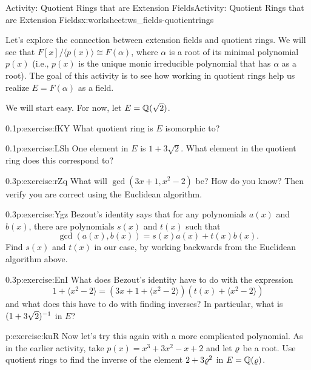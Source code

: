 \documentclass[11pt]{book}
\begin{document}
%
%
\typeout{************************************************}
\typeout{************************************************}
%
\begin{worksheet-subsection}{Activity: Quotient Rings that are Extension Fields}{}{Activity: Quotient Rings that are Extension Fields}{}{}{x:worksheet:ws_fields-quotientrings}
\begin{introduction}{}%
Let's explore the connection between extension fields and quotient rings. We will see that \(F[x]/\langle p(x) \rangle \cong F(\alpha)\), where \(\alpha\) is a root of its minimal polynomial \(p(x)\) (i.e., \(p(x)\) is the unique monic irreducible polynomial that has \(\alpha\) as a root).  The goal of this activity is to see how working in quotient rings help us realize \(E = F(\alpha)\) as a field.%
\par
We will start easy.  For now, let \(E = \mathbb{Q}(\sqrt{2})\).%
\end{introduction}%
\begin{divisionexercise}{1}{}{0.1}{p:exercise:fKY}%
What quotient ring is \(E\) isomorphic to?%
\end{divisionexercise}%
\begin{divisionexercise}{2}{}{0.1}{p:exercise:LSh}%
One element in \(E\) is \(1+3\sqrt{2}\).  What element in the quotient ring does this correspond to?%
\end{divisionexercise}%
\begin{divisionexercise}{3}{}{0.3}{p:exercise:rZq}%
What will \(\gcd(3x+1, x^2 - 2)\) be?  How do you know?  Then verify you are correct using the Euclidean algorithm.%
\end{divisionexercise}%
\clearpage
\begin{divisionexercise}{4}{}{0.3}{p:exercise:Ygz}%
Bezout's identity says that for any polynomials \(a(x)\) and \(b(x)\), there are polynomials \(s(x)\) and \(t(x)\) such that%
\begin{equation*}
\gcd(a(x), b(x)) = s(x)a(x) + t(x)b(x)\text{.}
\end{equation*}
Find \(s(x)\) and \(t(x)\) in our case, by working backwards from the Euclidean algorithm above.%
\end{divisionexercise}%
\begin{divisionexercise}{5}{}{0.3}{p:exercise:EnI}%
What does Bezout's identity have to do with the expression%
\begin{equation*}
1+\langle x^2 - 2\rangle = (3x+1 + \langle x^2 - 2\rangle)(t(x) + \langle x^2 - 2\rangle)
\end{equation*}
and what does this have to do with finding inverses?  In particular, what is \((1+3\sqrt{2})^{-1}\) in \(E\)?%
\end{divisionexercise}%
\begin{divisionexercise}{6}{}{}{p:exercise:kuR}%
Now let's try this again with a more complicated polynomial.  As in the earlier activity, take \(p(x) = x^3 + 3x^2 - x + 2\) and let \(\varrho\) be a root.  Use quotient rings to find the inverse of the element \(2 + 3\varrho^2\) in \(E = \mathbb{Q}(\varrho)\).%
\end{divisionexercise}%
\end{worksheet-subsection}
\restoregeometry
\end{document}

